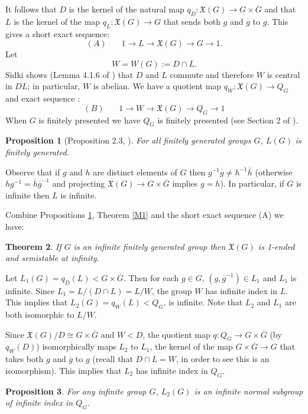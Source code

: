 \documentclass[12pt]{article}
\newtheorem{theorem}{Theorem}[subsection]
\newtheorem{proposition}[theorem]{Proposition}
\begin{document}
It follows that $D$ is the kernel of the natural map $q_D:\mathfrak{X} (G)\to  G \times \overline G$ and that $L$ is the kernel of the map $q_L:\mathfrak{X} (G) \to  G$ that sends both $g$ and $\overline g$ to $g$. This gives a short exact sequence:
$$(A)\ \ \ \ \ \ \ \ 1\to L\to \mathfrak{X}(G)\to G\to 1.$$
Let 
$$W=W(G):= D\cap L.$$
Sidki shows (Lemma 4.1.6 of \cite{Sid80}) that $D$ and $L$ commute and therefore $W$ is central in $DL$; in particular, $W$ is abelian. We have a quotient map $q_W:\mathfrak{X}(G)\to Q_G$ and exact sequence :
$$(B)\ \ \ \ \ \ \ \ 1\to W\to \mathfrak{X}(G)\to Q_G\to 1$$
When $G$ is finitely presented we have $Q_G$ is finitely presented (see Section 2 of \cite{BK19}). 

 

\begin{proposition} [Proposition 2.3, \cite{BK19}] \label{Lfg} 
For all finitely generated groups $G$, $L(G)$ is finitely generated. 
\end{proposition} 

Observe that if $g$ and $ h$ are distinct elements of $G$ then $g^{-1}\overline g\ne h^{-1}\overline h$ (otherwise $hg^{-1}=\overline h\overline g^{-1}$ and projecting $\mathfrak{X}(G)\to G\times \overline G$ implies  $g=h$). In particular, if $G$ is infinite then $L$ is infinite. 

Combine Propositions \ref{Lfg}, Theorem \ref{M1} and the short exact sequence (A) we have:

\begin{theorem} \label{SDSSI} 
If $G$ is an infinite finitely generated group then $\mathfrak{X}(G)$ is 1-ended and semistable at infinity. 
\end{theorem}

Let $L_1(G)=q_D(L)< G\times \bar G$. Then for each $g\in G$, $(g,\overline g^{-1})\in L_1$ and $L_1$ is infinite. Since $L_1=L/(D\cap L)=L/W$, the group $W$ has infinite index in $L$. This implies that $L_2(G)=q_W(L)<Q_G$, is infinite. Note that $L_2$ and $L_1$ are both isomorphic to $L/W$. 

Since $\mathfrak{X}(G)/D\cong G\times \overline G$ and $W< D$,  the quotient map  $q:Q_G\to G\times \overline G$ (by $q_W(D)$) isomorphically maps $L_2$ to $L_1$, the kernel of the map $G\times \overline G\to G$  that takes both $g$ and $\overline g$ to $g$ (recall that $D\cap L=W$, in order to see this is an isomorphism). This implies that $L_2$ has infinite index in $Q_G$. 

\begin{proposition}\label{INII}
For any infinite group $G$, $L_2(G)$ is an infinite normal subgroup of infinite index in $Q_G$.
\end{proposition}
\end{document}

